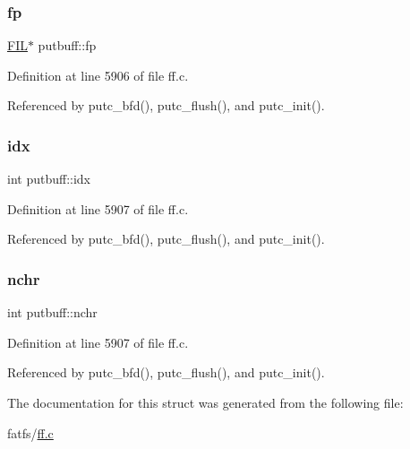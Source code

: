 \subsubsection{\texorpdfstring{fp}{fp}}
{\footnotesize\ttfamily \hyperlink{structFIL}{F\+IL}$\ast$ putbuff\+::fp}



Definition at line 5906 of file ff.\+c.



Referenced by putc\+\_\+bfd(), putc\+\_\+flush(), and putc\+\_\+init().

\mbox{\label{structputbuff_a10a3ca93af8df07e9836ebd5230c06d8}} 
\subsubsection{\texorpdfstring{idx}{idx}}
{\footnotesize\ttfamily int putbuff\+::idx}



Definition at line 5907 of file ff.\+c.



Referenced by putc\+\_\+bfd(), putc\+\_\+flush(), and putc\+\_\+init().

\mbox{\label{structputbuff_a125366bfe48077e6f562f95e30b4604a}} 
\subsubsection{\texorpdfstring{nchr}{nchr}}
{\footnotesize\ttfamily int putbuff\+::nchr}



Definition at line 5907 of file ff.\+c.



Referenced by putc\+\_\+bfd(), putc\+\_\+flush(), and putc\+\_\+init().



The documentation for this struct was generated from the following file\+:\begin{DoxyCompactItemize}
\item 
fatfs/\hyperlink{ff_8c}{ff.\+c}\end{DoxyCompactItemize}
